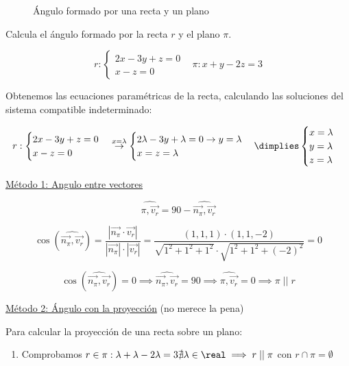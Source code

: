 \begin{figure}[H]
\centering
{}

\caption{Ángulo formado por una recta y un plano}
\label{fig::ang-recta-plano}
\end{figure}

\begin{problem}

Calcula el ángulo formado por la recta $r$ y el plano $\pi$.

\[
r : \begin{cases} 2x-3y+z=0\\x-z=0\end{cases}\;\;\;\pi: x+y-2z=3
\]
\solution

Obtenemos las ecuaciones paramétricas de la recta, calculando las soluciones del sistema compatible indeterminado:

\[
r : \begin{cases} 2x-3y+z=0\\x-z=0\end{cases} \overset{x=\lambda}{\to}
\begin{cases} 2\lambda-3y+\lambda = 0 \to y=\lambda \\x=z=\lambda\end{cases} \dimplies \begin{cases}x=\lambda\\y=\lambda\\z=\lambda\end{cases}
\]

\ul{Método 1: Angulo entre vectores}

\[
\widehat{\pi,\vec{v_r}} = 90 - \widehat{\vec{n_{\pi}},\vec{v_r}}
\]

\[
\cos\left(\widehat{\vec{n_{\pi}},\vec{v_r}}\right) = \frac{|\vec{n_{\pi}}·\vec{v_r}|}{|\vec{n_{\pi}}|·|\vec{v_r}|} = \frac{(1,1,1)·(1,1,-2)}{\sqrt{1^2+1^2+1^2}·\sqrt{1^2+1^2+(-2)^2}} = 0 
\]

\[
\cos\left(\widehat{\vec{n_{\pi}},\vec{v_r}}\right) = 0\implies \widehat{\vec{n_{\pi}},\vec{v_r}} = 90 \implies \widehat{\pi,\vec{v_r}} = 0 \implies \pi\;||\; r
\]


\ul{Método 2: Ángulo con la proyección} (no merece la pena)

Para calcular la proyección de una recta sobre un plano:
\begin{enumerate}
  \item Comprobamos $r\in \pi: \lambda+\lambda-2\lambda = 3 \nexists\lambda\in\real\implies r\;||\;\pi$ con $r\cap\pi=\emptyset$ 
  

\end{enumerate}
\end{problem}
